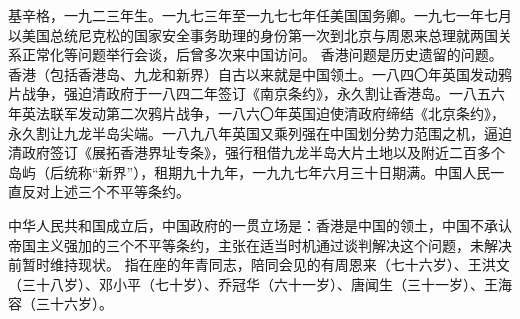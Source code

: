 \begin{maonote}
基辛格，一九二三年生。一九七三年至一九七七年任美国国务卿。一九七一年七月以美国总统尼克松的国家安全事务助理的身份第一次到北京与周恩来总理就两国关系正常化等问题举行会谈，后曾多次来中国访问。
香港问题是历史遗留的问题。香港（包括香港岛、九龙和新界）自古以来就是中国领土。一八四〇年英国发动鸦片战争，强迫清政府于一八四二年签订《南京条约》，永久割让香港岛。一八五六年英法联军发动第二次鸦片战争，一八六〇年英国迫使清政府缔结《北京条约》，永久割让九龙半岛尖端。一八九八年英国又乘列强在中国划分势力范围之机，逼迫清政府签订《展拓香港界址专条》，强行租借九龙半岛大片土地以及附近二百多个岛屿（后统称“新界”），租期九十九年，一九九七年六月三十日期满。中国人民一直反对上述三个不平等条约。

中华人民共和国成立后，中国政府的一贯立场是：香港是中国的领土，中国不承认帝国主义强加的三个不平等条约，主张在适当时机通过谈判解决这个问题，未解决前暂时维持现状。
指在座的年青同志，陪同会见的有周恩来（七十六岁）、王洪文（三十八岁）、邓小平（七十岁）、乔冠华（六十一岁）、唐闻生（三十一岁）、王海容（三十六岁）。
\end{maonote}
